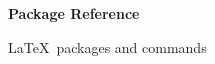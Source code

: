 \begin{center}
{\LARGE\bfseries Package Reference}\par
\vspace{2mm}
{\large \LaTeX\ packages and commands}
\end{center}
\vspace{3mm}
